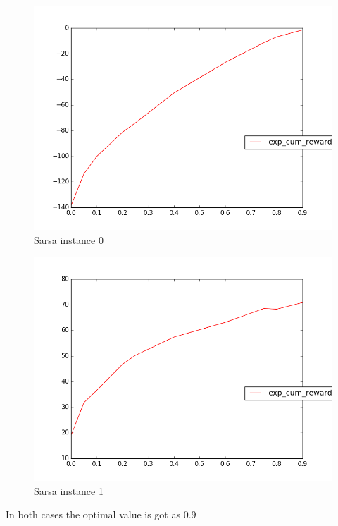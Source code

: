 \documentclass{article}
\begin{document}
\begin{figure}[H]
  \centering
  \includegraphics[scale=0.5]{images/sarsa_lamb_instance_0}
  \caption{Sarsa instance 0}
  \label{fig:srsli0}
\end{figure}

\begin{figure}[H]
  \centering
  \includegraphics[scale=0.5]{images/sarsa_lamb_instance_1}
  \caption{Sarsa instance 1}
  \label{fig:srsli1}
\end{figure}

In both cases the optimal value is got as 0.9
\end{document}
